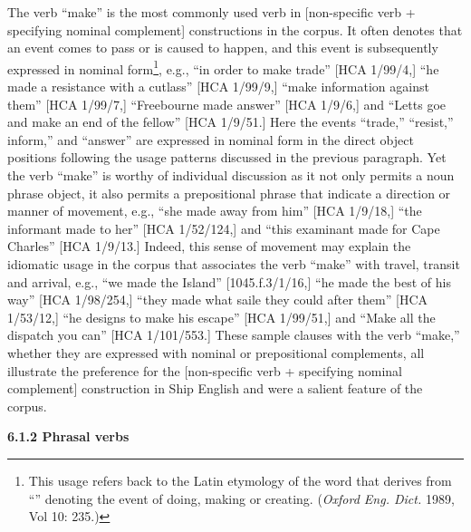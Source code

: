 \begin{styleStandard}
The verb “make” is the most commonly used verb in [non-specific verb + specifying nominal complement] constructions in the corpus. It often denotes that an event comes to pass or is caused to happen, and this event is subsequently expressed in nominal form\footnote{ This usage refers back to the Latin etymology of the word that derives from “” denoting the event of doing, making or creating. (\textit{Oxford Eng. Dict. }1989, Vol 10: 235.) }, e.g., “in order to make trade” [HCA 1/99/4,] “he made a resistance with a cutlass” [HCA 1/99/9,] “make information against them” [HCA 1/99/7,] “Freebourne made answer” [HCA 1/9/6,] and “Letts goe and make an end of the fellow” [HCA 1/9/51.] Here the events “trade,” “resist,” inform,” and “answer” are expressed in nominal form in the direct object positions following the usage patterns discussed in the previous paragraph. Yet the verb “make” is worthy of individual discussion as it not only permits a noun phrase object, it also permits a prepositional phrase that indicate a direction or manner of movement, e.g., “she made away from him” [HCA 1/9/18,] “the informant made to her” [HCA 1/52/124,] and “this examinant made for Cape Charles” [HCA 1/9/13.] Indeed, this sense of movement may explain the idiomatic usage in the corpus that associates the verb “make” with travel, transit and arrival, e.g., “we made the Island” [1045.f.3/1/16,] “he made the best of his way” [HCA 1/98/254,] “they made what saile they could after them” [HCA 1/53/12,] “he designs to make his escape” [HCA 1/99/51,] and “Make all the dispatch you can” [HCA 1/101/553.] These sample clauses with the verb “make,” whether they are expressed with nominal or prepositional complements, all illustrate the preference for the [non-specific verb + specifying nominal complement] construction in Ship English and were a salient feature of the corpus. 
\end{styleStandard}


\begin{styleStandard}
\textbf{6.1.2 Phrasal verbs}
\end{styleStandard}


